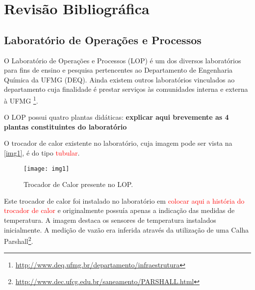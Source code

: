 \chapter{Revisão Bibliográfica}
	
	\section{Laboratório de Operações e Processos}
		O Laboratório de Operações e Processos (LOP) é um dos diversos laboratórios para fins de ensino e pesquisa pertencentes ao Departamento de Engenharia Química da UFMG (DEQ). Ainda existem outros laboratórios vinculados ao departamento cuja finalidade é prestar serviços às comunidades interna e externa à UFMG \footnote{\url{http://www.deq.ufmg.br/departamento/infraestrutura}}.
		
		O LOP possui quatro plantas didáticas: \textbf{explicar aqui brevemente as 4 plantas constituintes do laboratório}
		
		O trocador de calor existente no laboratório, cuja imagem pode ser vista na \autoref{img1}, é do tipo \textcolor{red}{tubular}. 
		
		\begin{figure}[!htb]
			\centering
			\texttt{[image: img1]}  %
			\caption{Trocador de Calor presente no LOP.}
			\label{img1}
		\end{figure}
	
		Este trocador de calor foi instalado no laboratório em \textcolor{red}{colocar aqui a história do trocador de calor} e originalmente possuía apenas a indicação das medidas de temperatura. A imagem destaca os sensores de temperatura instalados inicialmente. A medição de vazão era inferida através da utilização de uma Calha Parshall\footnote{\url{http://www.dec.ufcg.edu.br/saneamento/PARSHALL.html}}.
			
